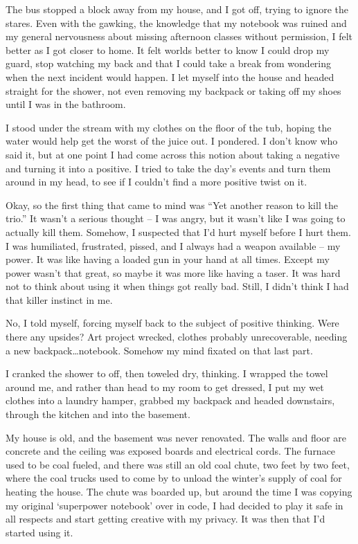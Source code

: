 The bus stopped a block away from my house, and I got off, trying to ignore the stares.  Even with the gawking, the knowledge that my notebook was ruined and my general nervousness about missing afternoon classes without permission, I felt better as I got closer to home.  It felt worlds better to know I could drop my guard, stop watching my back and that I could take a break from wondering when the next incident would happen.  I let myself into the house and headed straight for the shower, not even removing my backpack or taking off my shoes until I was in the bathroom.



I stood under the stream with my clothes on the floor of the tub, hoping the water would help get the worst of the juice out.  I pondered.  I don't know who said it, but at one point I had come across this notion about taking a negative and turning it into a positive.  I tried to take the day's events and turn them around in my head, to see if I couldn't find a more positive twist on it.



Okay, so the first thing that came to mind was ``Yet another reason to kill the trio.''  It wasn't a serious thought – I was angry, but it wasn't like I was going to actually kill them.   Somehow, I suspected that I'd hurt myself before I hurt them.  I was humiliated, frustrated, pissed, and I always had a weapon available – my power.  It was like having a loaded gun in your hand at all times.  Except my power wasn't that great, so maybe it was more like having a taser.  It was hard not to think about using it when things got really bad.  Still, I didn't think I had that killer instinct in me.



No, I told myself, forcing myself back to the subject of positive thinking.  Were there any upsides?  Art project wrecked, clothes probably unrecoverable, needing a new backpack\ldots  notebook.  Somehow my mind fixated on that last part.



I cranked the shower to off, then toweled dry, thinking.  I wrapped the towel around me, and rather than head to my room to get dressed, I put my wet clothes into a laundry hamper, grabbed my backpack and headed downstairs, through the kitchen and into the basement.



My house is old, and the basement was never renovated.  The walls and floor are concrete and the ceiling was exposed boards and electrical cords.  The furnace used to be coal fueled, and there was still an old coal chute, two feet by two feet, where the coal trucks used to come by to unload the winter's supply of coal for heating the house.  The chute was boarded up, but around the time I was copying my original `superpower notebook' over in code, I had decided to play it safe in all respects and start getting creative with my privacy.  It was then that I'd started using it.



